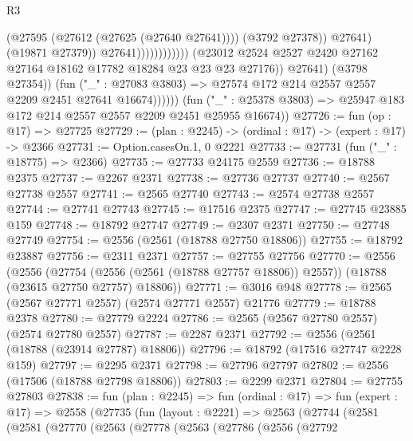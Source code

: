 \begin{lexlean}{R3}
\begin{coremodule}
                                                    (@27595 (@27612 (@27625 (@27640 @27641))))
                                                    (@3792 @27378))
                                                  @27641)
                                                (@19871 @27379))
                                              @27641))))))))))))
                      (@23012
                        @2524
                        @2527
                        @2420
                        @27162
                        @27164
                        @18162
                        @17782
                        @18284
                        @23
                        @23
                        @23
                        @27176))
                    @27641)
                  (@3798 @27354))
                (fun ("_" : @27083 @3803) =>
                @27574 @172 @214 @2557 @2557 @2209 @2451 @27641 @16674))))))
      (fun ("_" : @25378 @3803) => @25947 @183 @172 @214 @2557 @2557 @2209 @2451 @25955 @16674))
@27726 := fun (op : @17) => @27725
@27729 := (plan : @2245) -> (ordinal : @17) -> (expert : @17) -> @2366
@27731 := Option.casesOn.{1, 0} @2221
@27733 := @27731 (fun ("_" : @18775) => @2366)
@27735 := @27733 @24175 @2559
@27736 := @18788 @2375
@27737 := @2267 @2371
@27738 := @27736 @27737
@27740 := @2567 @27738 @2557
@27741 := @2565 @27740
@27743 := @2574 @27738 @2557
@27744 := @27741 @27743
@27745 := @17516 @2375
@27747 := @27745 @23885 @159
@27748 := @18792 @27747
@27749 := @2307 @2371
@27750 := @27748 @27749
@27754 := @2556 (@2561 (@18788 @27750 @18806))
@27755 := @18792 @23887
@27756 := @2311 @2371
@27757 := @27755 @27756
@27770 := @2556
    (@2556
      (@27754 (@2556 (@2561 (@18788 @27757 @18806)) @2557))
      (@18788 (@23615 @27750 @27757) @18806))
@27771 := @3016 @948
@27778 := @2565 (@2567 @27771 @2557) (@2574 @27771 @2557) @21776
@27779 := @18788 @2378
@27780 := @27779 @2224
@27786 := @2565 (@2567 @27780 @2557) (@2574 @27780 @2557)
@27787 := @2287 @2371
@27792 := @2556 (@2561 (@18788 (@23914 @27787) @18806))
@27796 := @18792 (@17516 @27747 @2228 @159)
@27797 := @2295 @2371
@27798 := @27796 @27797
@27802 := @2556 (@17506 (@18788 @27798 @18806))
@27803 := @2299 @2371
@27804 := @27755 @27803
@27838 := fun (plan : @2245) =>
  fun (ordinal : @17) =>
  fun (expert : @17) =>
  @2558
    (@27735
      (fun (layout : @2221) =>
      @2563
        (@27744
          (@2581
            (@2581
              (@27770
                (@2563
                  (@27778
                    (@2563
                      (@27786
                        (@2556
                          (@27792

\end{coremodule}
\end{lexlean}
